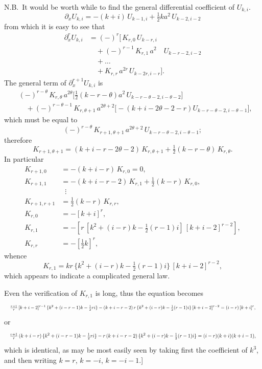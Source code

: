 \documentclass[11pt]{article}
\begin{document}
\noindent N.B.\ It would be worth while to find the general differential coefficient of $U_{k,i}$.
\[
  \partial_{x}\!U_{k,i} = -(k+i)\,U_{k-1,i} + \tfrac{1}{2}ka^{2}\,U_{k-2,i-2}
\]
from which it is easy to see that
\begin{align*}
  \partial_{x}^{r}\!U_{k,i} &= (-)^{r}\bigl[\, K_{r,0}\, U_{k-r,i} \\
   &\quad + (-)^{r-1}\,K_{r,1}\,a^{2}\!\!\quad U_{k-r-2,i-2} \\
   &\quad + \dots \\
   &\quad + K_{r,r}\,a^{2r}\,U_{k-2r,i-r}\bigr].
\end{align*}
The general term of $\partial_{x}^{r+1}U_{k,i}$ is
\begin{align*}
  &(-)^{r-\theta}\,K_{r,\theta}\,a^{2\theta}\bigl[\tfrac{1}{2}(k-r-\theta)a^{2}\,U_{k-r-\theta-2,i-\theta-2}\bigr] \\
   &\quad + (-)^{r-\theta-1}\,K_{r,\theta+1}\,a^{2\theta+2}\bigl[-(k+i-2\theta-2-r)U_{k-r-\theta-2,i-\theta-1}\bigr],
\end{align*}
which must be equal to
\[
  (-)^{r-\theta}\,K_{r+1,\theta+1}\,a^{2\theta+2}\,U_{k-r-\theta-2,i-\theta-1};
\]
therefore
\[
  K_{r+1,\theta+1} = (k+i-r-2\theta-2)\,K_{r,\theta+1} + \tfrac{1}{2}(k-r-\theta)\,K_{r,\theta}.
\]
In particular
\begin{align*}
  K_{r+1,0} &= -(k+i-r)\,K_{r,0} = 0, \\
  K_{r+1,1} &= -(k+i-r-2)\,K_{r,1} + \tfrac{1}{2}(k-r)\,K_{r,0}, \\
  &\;\;\vdots \\
  K_{r+1,r+1} &= \tfrac{1}{2}(k-r)\,K_{r,r}, \\
  K_{r,0} &= -[k+i]^{r}, \\
  K_{r,1} &= -[r\,[k^{2}+(i-r)k - \tfrac{1}{2}(r-1)i]\,[k+i-2]^{r-2}], \\
  K_{r,r} &= -[\tfrac{1}{2}k]^{r},
\end{align*}
whence
\[
  K_{r,1} = kr\,\{k^{2} + (i-r)k - \tfrac{1}{2}(r-1)i\}\,[k+i-2]^{r-2},
\]
which appears to indicate a complicated general law.

Even the verification of $K_{r,1}$ is long, thus the equation becomes
\[
  \resizebox{\textwidth}{!}{$\displaystyle
  \tfrac{r+1}{r}\,[k+i-2]^{r-1}\,\{k^{2}+(i-r-1)k - \tfrac{1}{2}ri\} - (k+i-r-2)\,r\,\{k^{2}+(i-r)k - \tfrac{1}{2}(r-1)i\}\,[k+i-2]^{r-2} = (i-r)\,[k+i]^{r},
  $}
\]
or
\[
  \resizebox{\textwidth}{!}{$\displaystyle
  \tfrac{r+1}{r}\,(k+i-r)\,\{k^{2}+(i-r-1)k - \tfrac{1}{2}ri\} - r\,(k+i-r-2)\,\{k^{2}+(i-r)k - \tfrac{1}{2}(r-1)i\} = (i-r)(k+i)(k+i-1),
  $}
\]
which is identical, as may be most easily seen by taking first the coefficient of $k^{3}$, and then writing $k = r$, $k = -i$, $k = -i-1$.]
\end{document}

